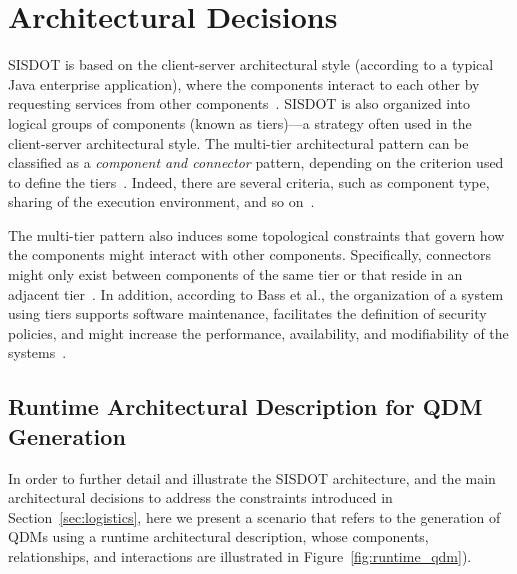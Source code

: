 \section{Architectural Decisions}
\label{sec:architecture} 

SISDOT is based on the client-server architectural style (according to a typical Java enterprise application), where the components interact to each other by requesting services from other components~\cite{clements2011documenting}. SISDOT is also organized into logical groups of components (known as tiers)---a strategy often used in the client-server architectural style. The multi-tier architectural pattern can be classified as a \emph{component and connector} pattern, depending on the criterion used to define the tiers~\cite{bass2013software}. Indeed, there are several criteria, such as component type, sharing of the execution environment, 
and so on~\cite{clements2011documenting}.

The multi-tier pattern also induces some topological constraints that govern how the components might interact with other components. 
Specifically, connectors might only exist between components of the same tier or that reside in an adjacent tier~\cite{clements2011documenting}. In addition, according to Bass et al., the organization of a system using tiers supports software maintenance, facilitates the definition of security policies, and might increase the performance, availability, and modifiability of 
the systems~\cite{bass2013software}. 



\subsection{Runtime Architectural Description for QDM Generation}

In order to further detail and illustrate the SISDOT architecture, and the main architectural decisions to address the constraints introduced in Section~\ref{sec:logistics}, here we present a scenario that refers to the generation of QDMs using a runtime architectural description, whose components, relationships, and interactions are illustrated in Figure~\ref{fig:runtime_qdm}). 

